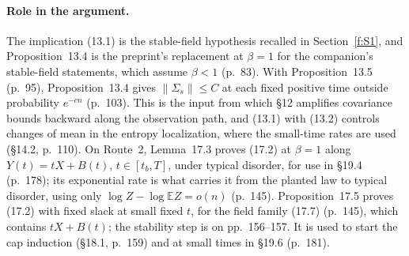 \documentclass[11pt]{article}
\newcommand{\E}{\mathbb{E}}
\newcommand{\norm}[1]{\lVert #1\rVert}
\newcommand{\ploc}[2]{#1}
\begin{document}
\paragraph{Role in the argument.}
The implication (13.1) is the stable-field hypothesis recalled in
Section~\ref{f:S1}, and Proposition~13.4 is the preprint's replacement at
$\beta=1$ for the companion's stable-field statements, which assume $\beta<1$
\ploc{(p.~83)}{profile-positive.tex:33--39}. With
\ploc{Proposition~13.5 (p.~95)}{profile-positive.tex:974--1033}, Proposition~13.4
gives $\norm{\Sigma_s}\le C$ at each fixed positive time outside probability
$e^{-cn}$ \ploc{(p.~103)}{profile-positive.tex:1700--1716}. This is the input
from which \S12 amplifies covariance bounds backward along the observation
path, and (13.1) with (13.2) controls changes of mean in the entropy
localization, where the small-time rates are used
\ploc{(\S14.2, p.~110)}{profile-entropy.tex:490--495}.
On Route~2, Lemma~17.3 proves (17.2) at $\beta=1$ along $Y(t)=tX+B(t)$,
$t\in[t_b,T]$, under typical disorder, for use in
\ploc{\S19.4 (p.~178)}{cap-entropy.tex:524--526}; its exponential rate is what
carries it from the planted law to typical disorder, using only
$\log Z-\log\E Z=o(n)$ \ploc{(p.~145)}{cap-classical.tex:444--449}.
Proposition~17.5 proves (17.2) with fixed slack at small fixed $t$, for the
field family \ploc{(17.7) (p.~145)}{cap-classical.tex:457--464}, which contains
$tX+B(t)$; the stability step is on
\ploc{pp.~156--157}{cap-classical.tex:1308--1375}. It is used to start the cap
induction \ploc{(\S18.1, p.~159)}{cap-initialization.tex:67} and at small times
in \ploc{\S19.6 (p.~181)}{cap-entropy.tex:721--753}.
\end{document}
